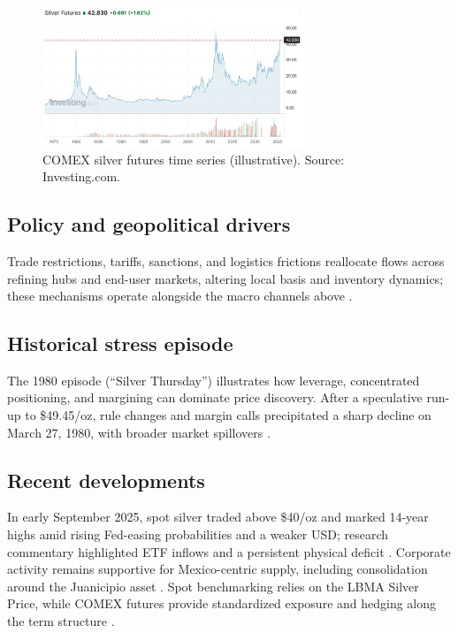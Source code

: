 \documentclass[11pt,a4paper]{article} %
\begin{document}
\begin{figure}[h]
\centering
\includegraphics[width=0.7\textwidth]{figures/silver_time_series.jpg}
\caption{COMEX silver futures time series (illustrative). Source: Investing.com.}
\label{fig:silver_time_series}
\end{figure}

\subsection{Policy and geopolitical drivers}
Trade restrictions, tariffs, sanctions, and logistics frictions reallocate flows across refining hubs and end-user markets, altering local basis and inventory dynamics; these mechanisms operate alongside the macro channels above \citep{silver_institute_wss_2024}.

\subsection{Historical stress episode}
The 1980 episode (“Silver Thursday”) illustrates how leverage, concentrated positioning, and margining can dominate price discovery. After a speculative run-up to \$49.45/oz, rule changes and margin calls precipitated a sharp decline on March 27, 1980, with broader market spillovers \citep{britannica_silver_thursday,nyt_1980_silver_thursday}.

\subsection{Recent developments}
In early September 2025, spot silver traded above \$40/oz and marked 14-year highs amid rising Fed-easing probabilities and a weaker USD; research commentary highlighted ETF inflows and a persistent physical deficit \citep{reuters_silver_14y_sep1,reuters_tradingday_sep11,reuters_anz_raises_silver,lbma_q2_2025}. Corporate activity remains supportive for Mexico-centric supply, including consolidation around the Juanicipio asset \citep{reuters_paasmag}. Spot benchmarking relies on the LBMA Silver Price, while COMEX futures provide standardized exposure and hedging along the term structure \citep{lbma_prices,cme_silver_overview}.
\end{document}
